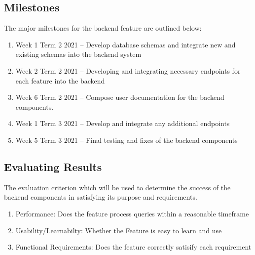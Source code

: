 \newpage
\subsection{Milestones}
The major milestones for the backend feature are outlined below: 

\begin{enumerate}
\item Week 1 Term 2 2021 – Develop database schemas and integrate new and existing schemas into the backend system
\item Week 2 Term 2 2021 – Developing and integrating necessary endpoints for each feature into the backend
\item Week 6 Term 2 2021 – Compose user documentation for the backend components.
\item Week 1 Term 3 2021 – Develop and integrate any additional endpoints
\item Week 5 Term 3 2021 – Final testing and fixes of the backend components
\end{enumerate}

\subsection{Evaluating Results}
The evaluation criterion which will be used to determine the success of the backend components in satisfying its purpose and requirements.

\begin{enumerate}
    \item Performance: Does the feature process queries within a reasonable timeframe
    \item Usability/Learnabilty: Whether the Feature is easy to learn and use
    \item Functional Requirements: Does the feature correctly satisify each requirement
\end{enumerate}